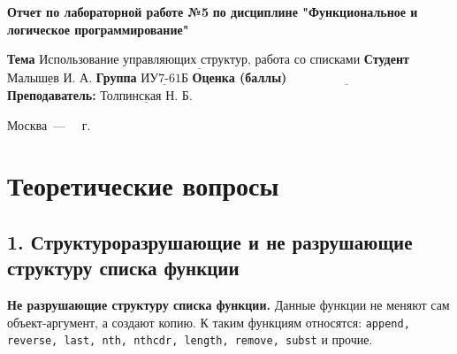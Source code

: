 \documentclass[12pt]{report}
\begin{document}
\begin{titlepage}
	
	\begin{center}
		\noindent\begin{minipage}{1.3\textwidth}\centering
			\Large\textbf{  Отчет по лабораторной работе №5}\newline
			\textbf{по дисциплине \newline "Функциональное и логическое программирование"}\newline\newline
		\end{minipage}
	\end{center}
	
	\noindent\textbf{Тема} $\underline{\text{Использование управляющих структур, работа со списками}}$\newline\newline
	\noindent\textbf{Студент} $\underline{\text{Малышев И. А.}}$\newline\newline
	\noindent\textbf{Группа} $\underline{\text{ИУ7-61Б}}$\newline\newline
	\noindent\textbf{Оценка (баллы)} $\underline{\text{~~~~~~~~~~~~~~~~~~~~~~~~~~~}}$\newline\newline
	\noindent\textbf{Преподаватель: } $\underline{\text{Толпинская Н. Б.}}$\newline\newline\newline
	
	\begin{center}
		\vfill
		Москва~---~\the\year
		~г.
	\end{center}
\end{titlepage}


\setcounter{page}{2}
\chapter*{Теоретические вопросы}

\section*{1. Структуроразрушающие и не разрушающие структуру списка функции}

\textbf{Не разрушающие структуру списка функции.} Данные функции не меняют сам объект-аргумент, а создают копию. К таким функциям относятся: 
\texttt{append, reverse, last, nth, nthcdr, length, remove, subst} и прочие.\\
\end{document}
